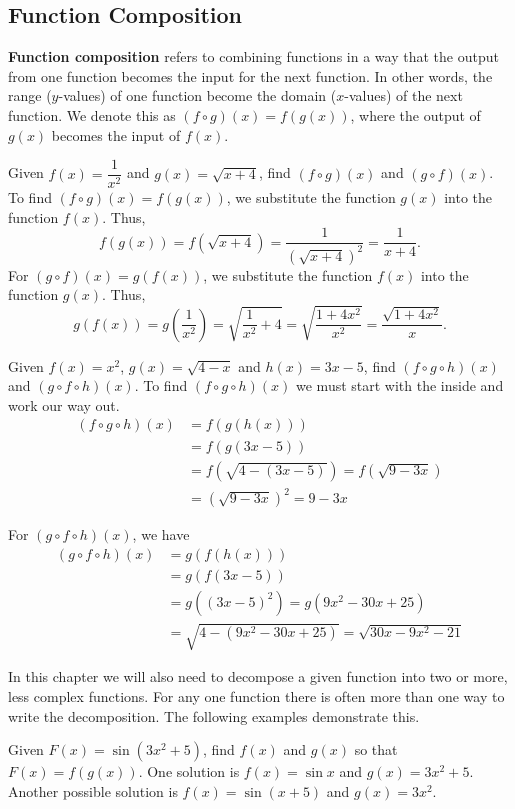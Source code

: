 \subsection{Function Composition}

\textbf{Function composition} refers to combining functions in a way that the output from one function becomes the input for the next function. In other words, the range ($y$-values) of one function become the domain ($x$-values) of the next function. We denote this as $(f \circ g)(x) = f(g(x))$, where the output of $g(x)$ becomes the input of $f(x)$.

\begin{example}\label{ex_prereq_comp_of_two}
Given $f(x)=\dfrac1{x^2}$ and $g(x)=\sqrt{x+4}$, find $(f \circ g)(x)$ and $(g \circ f)(x)$.
\solution
To find $(f\circ g)(x)=f(g(x))$, we substitute the function $g(x)$ into the function $f(x)$. Thus,
\[f(g(x))=f\left(\sqrt{x+4}\right)=\frac1{(\sqrt{x+4})^2}=\frac1{x+4}.\]
For $(g\circ f)(x)=g(f(x))$, we substitute the function $f(x)$ into the function $g(x)$. Thus,\vspace{-.3\baselineskip}
\[
 g(f(x))=g\left(\frac1{x^2}\right)=\sqrt{\frac1{x^2}+4}
 =\sqrt{\frac{1+4x^2}{x^2}}=\frac{\sqrt{1+4x^2}}x.
\]
\end{example}

\begin{example}\label{ex_prereq_comp_of_three}
Given $f(x)=x^2$, $g(x)=\sqrt{4-x}$ and $h(x)=3x-5$, find $(f\circ g\circ h)(x)$ and $(g\circ f\circ h)(x)$.
\solution
To find $(f\circ g\circ h)(x)$ we must start with the inside and work our way out.
\begin{align*}
(f\circ g\circ h)(x)&=f(g(h(x)))\\
&=f(g(3x-5))\\
&=f\left(\sqrt{4-(3x-5)}\right)=f\left(\sqrt{9-3x}\right)\\
&=\left(\sqrt{9-3x}\right)^2=9-3x
\end{align*}

For $(g\circ f\circ h)(x)$, we have
\begin{align*}
(g\circ f\circ h)(x)&=g(f(h(x)))\\
&=g(f(3x-5))\\
&=g((3x-5)^2)=g(9x^2-30x+25)\\
&=\sqrt{4-(9x^2-30x+25)}=\sqrt{30x-9x^2-21}
\end{align*}
\end{example}

In this chapter we will also need to decompose a given function into two or more, less complex functions. For any one function there is often more than one way to write the decomposition. The following examples demonstrate this.

\begin{example}\label{ex_prereq_decomp}
Given $F(x)=\sin(3x^2+5)$, find $f(x)$ and $g(x)$ so that $F(x) = f(g(x))$.
\solution
One solution is $f(x)=\sin x$ and $g(x)=3x^2+5$.\\
Another possible solution is $f(x)=\sin (x+5)$ and $g(x)=3x^2$.
\end{example}

